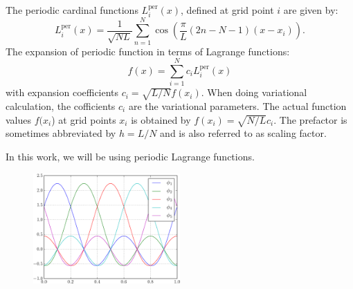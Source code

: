 The periodic cardinal functions $L_{i}^{\mathrm{per}}(x)$, defined
at grid point $i$ are given by:
\begin{equation}
L_{i}^{\mathrm{per}}(x)=\frac{1}{\sqrt{NL}}\sum_{n=1}^{N}\cos\left(\frac{\pi}{L}(2n-N-1)(x-x_{i})\right).
\label{eq:LF_p_1d}
\end{equation}
The expansion of periodic function in terms of Lagrange functions:
\begin{equation}
f(x)=\sum_{i=1}^{N}c_{i}L_{i}^{\mathrm{per}}(x)
\end{equation}
with expansion coefficients $c_{i}=\sqrt{L/N}f(x_{i})$. When doing
variational calculation, the cofficients $c_{i}$ are the variational
parameters. The actual function values $f(x_{i}$) at grid points
$x_{i}$ is obtained by $f(x_{i})=\sqrt{N/L}c_{i}$. The prefactor
is sometimes abbreviated by $h=L/N$ and is also referred to as scaling
factor.

In this work, we will be using periodic Lagrange functions.

\begin{figure}
\includegraphics[width=0.5\textwidth]{images/plot_LF_p_N_5.pdf}
\end{figure}


